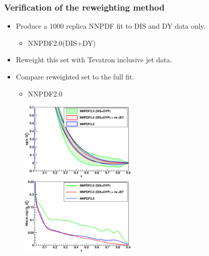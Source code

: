 \documentclass[10pt]{beamer}
\newcommand{\vso}{\vskip15pt}
\begin{document}
\begin{frame}
\frametitle{Verification of the reweighting method}
\begin{itemize}
		\item<1-> Produce a 1000 replica NNPDF fit to DIS and DY data only.
		\begin{itemize}
		\item<1-> NNPDF2.0(DIS+DY)
		\end{itemize}
		\item<1-> Reweight this set with Tevatron inclusive jet data.
		\item<1-> Compare reweighted set to the full fit.
				\begin{itemize}
		\item<1-> NNPDF2.0
		\end{itemize}
\end{itemize}
 \begin{figure}[b!]
    \begin{center}
      \includegraphics[width=0.50\textwidth]{jets-t0-xg_Q2_2_lin.eps}
      \includegraphics[width=0.50\textwidth]{jets-t0-abserror-xg_Q2_2_lin.eps}
    \end{center}
    \vskip-0.5cm

\end{figure} \vso


\end{frame}
\end{document}
